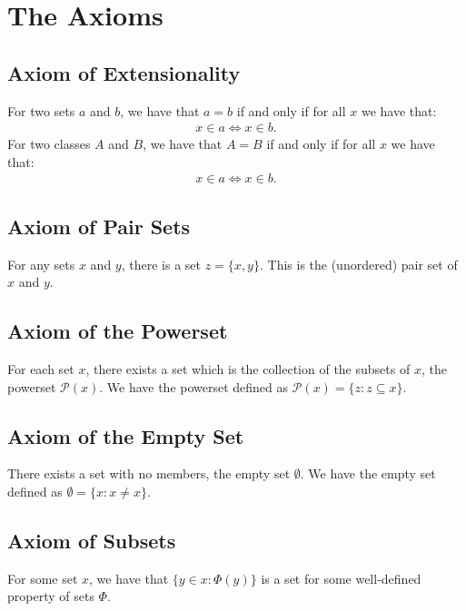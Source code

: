 \section{The Axioms}

\subsection{Axiom of Extensionality}

For two sets $a$ and $b$, we have that $a = b$ if and only if for all
$x$ we have that: \begin{align*}
    x \in a \Longleftrightarrow x \in b.
\end{align*} 
For two classes $A$ and $B$, we have that $A = B$ if and only if for all
$x$ we have that: \begin{align*}
    x \in a \Longleftrightarrow x \in b.
\end{align*}

\subsection{Axiom of Pair Sets}

For any sets $x$ and $y$, there is a set $z = \{x, y\}$. This is the
(unordered) pair set of $x$ and $y$.

\subsection{Axiom of the Powerset}

For each set $x$, there exists a set which is the collection of the
subsets of $x$, the powerset $\mathcal{P}(x)$.
We have the powerset defined as 
$\mathcal{P}(x) = \{z : z \subseteq x\}$.

\subsection{Axiom of the Empty Set}

There exists a set with no members, the empty set $\emptyset$.
We have the empty set defined as $\emptyset = \{x : x \neq x\}$.

\subsection{Axiom of Subsets}

For some set $x$, we have that $\{y \in x : \Phi(y)\}$ is a set
for some well-defined property of sets $\Phi$.


